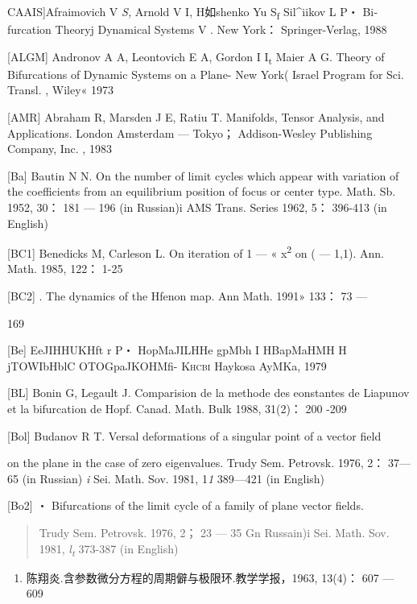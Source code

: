 \documentclass{article}
\begin{document}
CAAIS{]}Afraimovich V \emph{S,} Arnold V I, H如shenko Yu
S\textsubscript{f} Sil\^{}iikov L P・ Bi­furcation Theoryj Dynamical
Systems V . New York： Springer-Ver­lag, 1988

{[}ALGM{]} Andronov A A, Leontovich E A, Gordon I I\textsubscript{t}
Maier A G. Theory of Bifurcations of Dynamic Systems on a Plane- New
York( Israel Program for Sci. Transl. , Wiley« 1973

{[}AMR{]} Abraham R, Marsden J E, Ratiu T. Manifolds, Tensor Analysis,
and Applications. London Amsterdam --- Tokyo； Addison-Wesley Publishing
Company, Inc. , 1983

{[}Ba{]} Bautin N N. On the number of limit cycles which appear with
variation of the coefficients from an equilibrium position of focus or
center type. Math. Sb. 1952, 30： 181 --- 196 (in Russian)i AMS Trans.
Series 1962, 5： 396-413 (in English)

{[}BC1{]} Benedicks M, Carleson L. On iteration of 1 --- «
x\textsuperscript{2} on ( --- 1,1). Ann. Math. 1985, 122： 1-25

{[}BC2{]} . The dynamics of the Hfenon map. Ann Math. 1991» 133： 73 ---

169

{[}Be{]} EeJIHHUKHft r P・ HopMaJILHHe gpMbh I HBapMaHMH H jTOWIbHblC
OTOGpaJKOHMfi- \textsc{Khcbi} Haykosa AyMKa, 1979

{[}BL{]} Bonin G, Legault J. Comparision de la methode des eonstantes de
Lia­punov et la bifurcation de Hopf. Canad. Math. Bulk 1988, 31(2)： 200
-209

{[}Bol{]} Budanov R T. Versal deformations of a singular point of a
vector field

on the plane in the case of zero eigenvalues. Trudy Sem. Petrovsk. 1976,
2： 37---65 (in Russian) \emph{i} Sei. Math. Sov. 1981, 1\emph{1}
389---421 (in English)

{[}Bo2{]} ・ Bifurcations of the limit cycle of a family of plane vector
fields.

\begin{quote}
Trudy Sem. Petrovsk. 1976, 2； 23 --- 35 Gn Russain)i Sei. Math. Sov.
1981, \emph{l\textsubscript{t}} 373-387 (in English)
\end{quote}

\begin{enumerate}
\def\labelenumi{\Roman{enumi}.}
\setcounter{enumi}{99}
\item
  陈翔炎.含参数微分方程的周期僻与极限环.教学学报，1963, 13(4)： 607 ---
  609
\end{enumerate}
\end{document}
